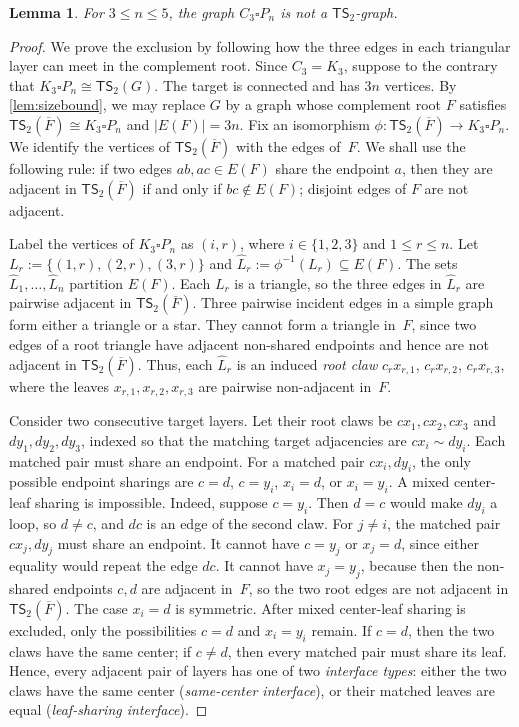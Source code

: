 \documentclass[a4paper]{article}
\theoremstyle{plain}
\newtheorem{lemma}[lemma]{Lemma}
\theoremstyle{definition}
\newcommand{\TSsym}{\mathsf{TS}}
\numberwithin{equation}{section}
\begin{document}
\begin{lemma}
\label{lem:cycle-path-triangular-strip-k2}
For $3\le n\le 5$, the graph $C_3\square P_n$ is not a $\TSsym_2$-graph.
\end{lemma}

\begin{proof}
We prove the exclusion by following how the three edges in each triangular layer can meet in the complement root.
Since $C_3=K_3$, suppose to the contrary that $K_3\square P_n\cong \TSsym_2(G)$.
The target is connected and has $3n$ vertices.
By \cref{lem:sizebound}, we may replace $G$ by a graph whose complement root $F$ satisfies $\TSsym_2(\overline{F})\cong K_3\square P_n$ and $|E(F)|=3n$.
Fix an isomorphism $\phi:\TSsym_2(\overline{F})\to K_3\square P_n$.
We identify the vertices of $\TSsym_2(\overline{F})$ with the edges of~$F$.
We shall use the following rule: if two edges $ab,ac\in E(F)$ share the endpoint $a$, then they are adjacent in $\TSsym_2(\overline{F})$ if and only if $bc\notin E(F)$; disjoint edges of $F$ are not adjacent.

Label the vertices of $K_3\square P_n$ as $(i,r)$, where $i\in\{1,2,3\}$ and $1\le r\le n$.
Let $L_r:=\{(1,r),(2,r),(3,r)\}$ and $\widehat L_r:=\phi^{-1}(L_r)\subseteq E(F)$.
The sets $\widehat L_1,\ldots,\widehat L_n$ partition $E(F)$.
Each $L_r$ is a triangle, so the three edges in $\widehat L_r$ are pairwise adjacent in $\TSsym_2(\overline{F})$.
Three pairwise incident edges in a simple graph form either a triangle or a star.
They cannot form a triangle in~$F$, since two edges of a root triangle have adjacent non-shared endpoints and hence are not adjacent in $\TSsym_2(\overline{F})$.
Thus, each $\widehat L_r$ is an induced \emph{root claw} $c_r x_{r,1}$, $c_r x_{r,2}$, $c_r x_{r,3}$,
where the leaves $x_{r,1},x_{r,2},x_{r,3}$ are pairwise non-adjacent in~$F$.

Consider two consecutive target layers.
Let their root claws be $cx_1,cx_2,cx_3$ and $dy_1,dy_2,dy_3$,
indexed so that the matching target adjacencies are $cx_i\sim dy_i$.
Each matched pair must share an endpoint.
For a matched pair $cx_i,dy_i$, the only possible endpoint sharings are $c=d$, $c=y_i$, $x_i=d$, or $x_i=y_i$.
A mixed center-leaf sharing is impossible.
Indeed, suppose $c=y_i$.
Then $d=c$ would make $dy_i$ a loop, so $d\ne c$, and $dc$ is an edge of the second claw.
For $j\ne i$, the matched pair $cx_j,dy_j$ must share an endpoint.
It cannot have $c=y_j$ or $x_j=d$, since either equality would repeat the edge $dc$.
It cannot have $x_j=y_j$, because then the non-shared endpoints $c,d$ are adjacent in~$F$, so the two root edges are not adjacent in $\TSsym_2(\overline{F})$.
The case $x_i=d$ is symmetric.
After mixed center-leaf sharing is excluded, only the possibilities $c=d$ and $x_i=y_i$ remain.
If $c=d$, then the two claws have the same center; if $c\ne d$, then every matched pair must share its leaf.
Hence, every adjacent pair of layers has one of two \emph{interface types}: either the two claws have the same center (\emph{same-center interface}), or their matched leaves are equal (\emph{leaf-sharing interface}).


\end{proof}
\end{document}
